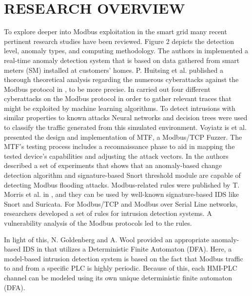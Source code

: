 \documentclass[letterpaper,10pt,conference]{IEEEtran}
\begin{document}
\section{RESEARCH OVERVIEW}
To explore deeper into Modbus exploitation in the smart grid many recent pertinent research studies have been reviewed. Figure 2 depicts the detection level, anomaly types, and computing methodology. The authors in \cite{R1} implemented a real-time anomaly detection system that is based on data gathered from smart meters (SM) installed at customers’ homes. P. Huitsing et al. published a thorough theoretical analysis regarding the numerous cyberattacks against the Modbus protocol in \cite{R2}, to be more precise.  In \cite{R4} carried out four different cyberattacks on the Modbus protocol in order to gather relevant traces that might be exploited by machine learning algorithms. To detect intrusions with similar properties to known attacks Neural networks and decision trees were used to classify the traffic generated from this simulated environment. 
Voyiatz is et al. \cite{R5} presented the design and implementation of MTF, a Modbus/TCP Fuzzer. The MTF's testing process includes a reconnaissance phase to aid in mapping the tested device's capabilities and adjusting the attack vectors.
In \cite{R6} the authors described a set of experiments that shows that an anomaly-based change detection algorithm and signature-based Snort threshold module are capable of detecting Modbus flooding attacks. Modbus-related rules were published by T. Morris et al. in \cite{R7}, and they can be used by well-known signature-based IDS like Snort and Suricata. For Modbus/TCP and Modbus over Serial Line networks, researchers developed a set of rules for intrusion detection systems. A vulnerability analysis of the Modbus protocols led to the rules.
 
In light of this, N. Goldenberg and A. Wool provided an appropriate anomaly-based IDS in \cite{R8} that utilizes a Deterministic Finite Automaton (DFA).  Here, a model-based intrusion detection system is based on the fact that Modbus traffic to and from a specific PLC is highly periodic. Because of this, each HMI-PLC channel can be modeled using its own unique deterministic finite automaton (DFA).
 
\end{document}
